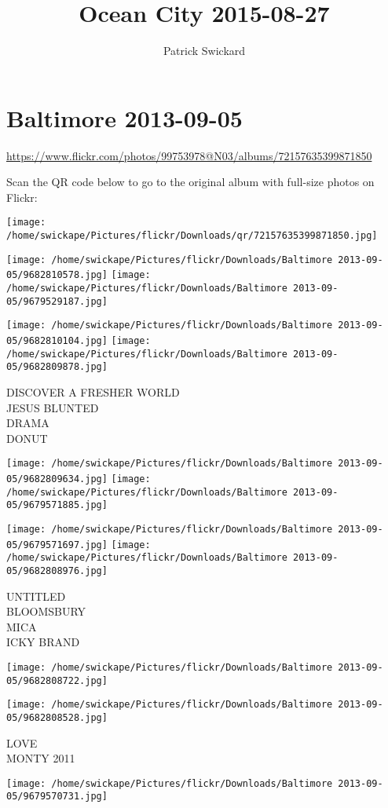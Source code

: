 \documentclass[10pt,letterpaper]{article}
\title{Ocean City 2015-08-27}
\author{Patrick Swickard}
\date{}
\begin{document}
\section*{Baltimore 2013-09-05}

\url{https://www.flickr.com/photos/99753978@N03/albums/72157635399871850}

Scan the QR code below to go to the original album with full-size photos on Flickr:

\texttt{[image: /home/swickape/Pictures/flickr/Downloads/qr/72157635399871850.jpg]}
\pagebreak

\texttt{[image: /home/swickape/Pictures/flickr/Downloads/Baltimore 2013-09-05/9682810578.jpg]}
\texttt{[image: /home/swickape/Pictures/flickr/Downloads/Baltimore 2013-09-05/9679529187.jpg]}

\texttt{[image: /home/swickape/Pictures/flickr/Downloads/Baltimore 2013-09-05/9682810104.jpg]}
\texttt{[image: /home/swickape/Pictures/flickr/Downloads/Baltimore 2013-09-05/9682809878.jpg]}

DISCOVER A FRESHER WORLD\\
JESUS BLUNTED\\
DRAMA\\
DONUT
\pagebreak

\texttt{[image: /home/swickape/Pictures/flickr/Downloads/Baltimore 2013-09-05/9682809634.jpg]}
\texttt{[image: /home/swickape/Pictures/flickr/Downloads/Baltimore 2013-09-05/9679571885.jpg]}

\texttt{[image: /home/swickape/Pictures/flickr/Downloads/Baltimore 2013-09-05/9679571697.jpg]}
\texttt{[image: /home/swickape/Pictures/flickr/Downloads/Baltimore 2013-09-05/9682808976.jpg]}

UNTITLED\\
BLOOMSBURY\\
MICA\\
ICKY BRAND
\pagebreak

\texttt{[image: /home/swickape/Pictures/flickr/Downloads/Baltimore 2013-09-05/9682808722.jpg]}

\vspace{0.25in}
\texttt{[image: /home/swickape/Pictures/flickr/Downloads/Baltimore 2013-09-05/9682808528.jpg]}

LOVE\\
MONTY 2011
\pagebreak

\texttt{[image: /home/swickape/Pictures/flickr/Downloads/Baltimore 2013-09-05/9679570731.jpg]}
\end{document}
